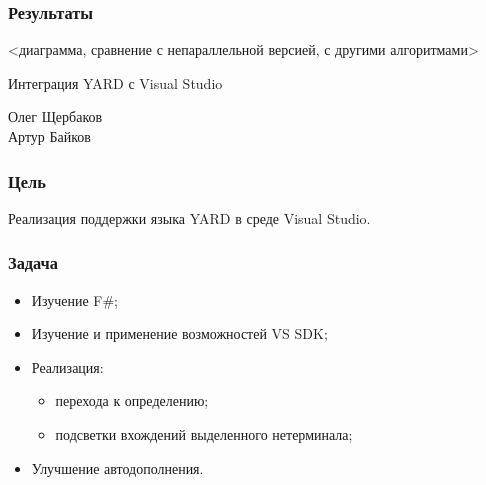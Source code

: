\documentclass{beamer}
\begin{document}
\begin{frame}
	\transwipe[direction=90]
	\frametitle{Результаты}
    <диаграмма, сравнение с непараллельной версией, с другими алгоритмами>
\end{frame}    


\author[Олег Щербаков, Артур Байков]{}

\begin{frame}
	\transwipe[direction=90]
	\begin{block}{}
	    \begin{center}
	        \huge{Интеграция YARD с Visual Studio}
	    \end{center}
	\end{block}
	\begin{center}
	    \huge
	        {Олег Щербаков
	        \\
            Артур Байков}
	\end{center}
\end{frame}

\begin{frame}
\frametitle{Цель}
    Реализация поддержки языка YARD в среде Visual Studio.
\end{frame}

\begin{frame}
	\transwipe[direction=90]
	\frametitle{Задача}
	\begin{itemize}
        \item Изучение F\#;
        \item Изучение и применение возможностей VS SDK;
        \item Реализация:
        	\begin{itemize}
            	\item перехода к определению;
            	\item подсветки вхождений выделенного нетерминала;
        	\end{itemize}
        \item Улучшение автодополнения.
    \end{itemize}
\end{frame}
\end{document}
